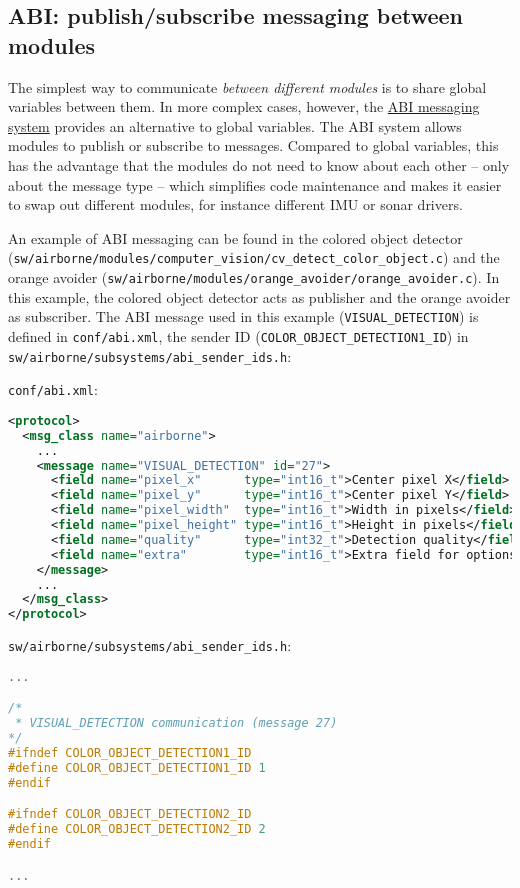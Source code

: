 \documentclass{article}
\begin{document}
\subsection{ABI: publish/subscribe messaging between modules}\label{sec:abi}
The simplest way to communicate \emph{between different modules} is to share global variables between them.
In more complex cases, however, the \href{http://wiki.paparazziuav.org/wiki/ABI}{ABI messaging system} provides an alternative to global variables.
The ABI system allows modules to publish or subscribe to messages. Compared to global variables, this has the advantage that the modules do not need to know about each other -- only about the message type -- which simplifies code maintenance and makes it easier to swap out different modules, for instance different IMU or sonar drivers.

An example of ABI messaging can be found in the colored object detector (\texttt{sw/airborne/modules/computer\_vision/cv\_detect\_color\_object.c}) and the orange avoider (\texttt{sw/airborne/modules/orange\_avoider/orange\_avoider.c}). In this example, the colored object detector acts as publisher and the orange avoider as subscriber. The ABI message used in this example (\texttt{VISUAL\_DETECTION}) is defined in \texttt{conf/abi.xml}, the sender ID (\texttt{COLOR\_OBJECT\_DETECTION1\_ID}) in \texttt{sw/airborne/subsystems/abi\_sender\_ids.h}:

\texttt{conf/abi.xml}:
\begin{lstlisting}[language=xml]
<protocol>
  <msg_class name="airborne">
    ...
    <message name="VISUAL_DETECTION" id="27">
      <field name="pixel_x"      type="int16_t">Center pixel X</field>
      <field name="pixel_y"      type="int16_t">Center pixel Y</field>
      <field name="pixel_width"  type="int16_t">Width in pixels</field>
      <field name="pixel_height" type="int16_t">Height in pixels</field>
      <field name="quality"      type="int32_t">Detection quality</field>
      <field name="extra"        type="int16_t">Extra field for options ...</field>
    </message>
    ...
  </msg_class>
</protocol>
\end{lstlisting}

\texttt{sw/airborne/subsystems/abi\_sender\_ids.h}:
\begin{lstlisting}[language=c]
...

/*
 * VISUAL_DETECTION communication (message 27)
*/
#ifndef COLOR_OBJECT_DETECTION1_ID
#define COLOR_OBJECT_DETECTION1_ID 1
#endif

#ifndef COLOR_OBJECT_DETECTION2_ID
#define COLOR_OBJECT_DETECTION2_ID 2
#endif

...
\end{lstlisting}
\end{document}

